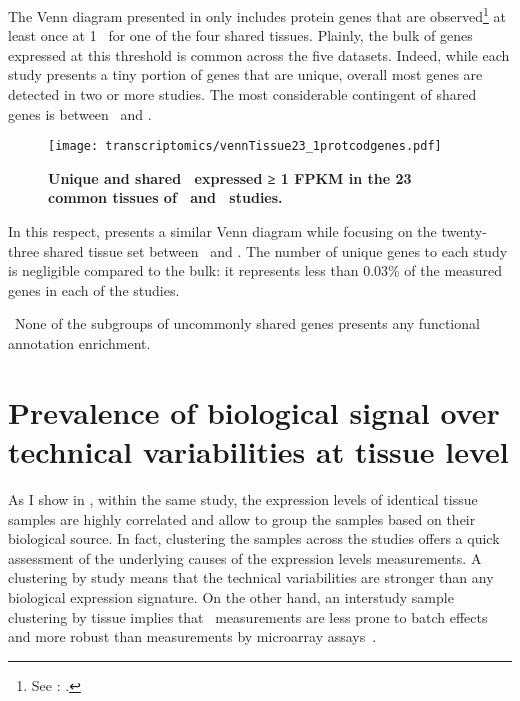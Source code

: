 The Venn diagram presented in  only includes protein
genes that are observed\footnote{See
: .}
at least once at 1 \FPKM\ for one of the four shared tissues.
Plainly, the bulk of genes expressed at this threshold is common
across the five datasets.
Indeed, while each study presents a tiny portion of genes
that are unique,
overall most genes are detected in two or more studies.
The most considerable contingent of shared genes is between \uhlen\ and \gtex.

\begin{figure}[h]
    \texttt{[image: transcriptomics/vennTissue23\_1protcodgenes.pdf]}\centering
    \caption[Unique and shared \pcgs\ expressed
    in the 23 common tissues (≥1 \FPKM)]%
    {\label{fig:ExpGenePcoding1_t23}\textbf{Unique
    and shared \pcgs\ expressed ≥ 1 FPKM in the 23 common tissues
    of \uhlen\ and \gtex\ studies.}}
\end{figure}

In this respect,  presents a similar Venn diagram
while focusing on the twenty-three shared tissue set between \uhlen\ and \gtex.
The number of unique genes to each study is negligible compared to the bulk:
it represents less than 0.03\% of the measured genes in each of the studies.
\begin{comment}
    Gtex:   462/17551 hence 0.02632329\%
    Uhlen:  281/17551 hence 0.01601048\%
\end{comment}

\NB\ None of the subgroups of uncommonly shared genes presents any functional
annotation enrichment.

\section{Prevalence of biological signal over technical variabilities at
tissue level}
\label{sec:Trans_ReproExpresTissue}

As I show in , within the same study,
the expression levels of identical tissue samples are highly correlated and
allow to group the samples based on their biological source.
In fact, clustering the samples across the studies offers a quick assessment of
the underlying causes of the expression levels measurements.
A clustering by study means that the technical variabilities are stronger
than any biological expression signature.
On the other hand,
an interstudy sample clustering by tissue implies that \Rnaseq\ measurements
are less prone to batch effects and more robust than measurements by
microarray assays~.

